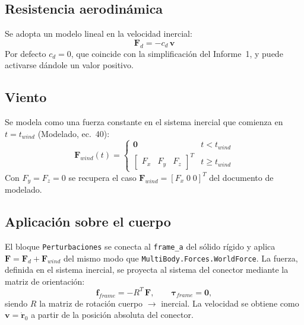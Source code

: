 \subsection{Resistencia aerodinámica}
Se adopta un modelo lineal en la velocidad inercial:
\begin{equation}
  \mathbf{F}_d = -c_d\, \mathbf{v}
\end{equation}
Por defecto $c_d = 0$, que coincide con la simplificación del Informe~1, y puede
activarse dándole un valor positivo.

\subsection{Viento}
Se modela como una fuerza constante en el sistema inercial que comienza en
$t = t_{wind}$ (Modelado, ec.~40):
\begin{equation}
  \mathbf{F}_{wind}(t) =
  \begin{cases}
    \mathbf{0} & t < t_{wind} \\
    \begin{bmatrix} F_x & F_y & F_z \end{bmatrix}^T & t \ge t_{wind}
  \end{cases}
\end{equation}
Con $F_y = F_z = 0$ se recupera el caso $\mathbf{F}_{wind} = [F_x\;0\;0]^T$ del
documento de modelado.

\subsection{Aplicación sobre el cuerpo}
El bloque \texttt{Perturbaciones} se conecta al \texttt{frame\_a} del sólido rígido y
aplica $\mathbf{F} = \mathbf{F}_d + \mathbf{F}_{wind}$ del mismo modo que
\texttt{MultiBody.Forces.WorldForce}. La fuerza, definida en el sistema inercial, se
proyecta al sistema del conector mediante la matriz de orientación:
\begin{equation}
  \mathbf{f}_{frame} = -R^T\, \mathbf{F}, \qquad \boldsymbol{\tau}_{frame} = \mathbf{0},
\end{equation}
siendo $R$ la matriz de rotación cuerpo $\rightarrow$ inercial. La velocidad se obtiene
como $\mathbf{v} = \dot{\mathbf{r}}_0$ a partir de la posición absoluta del conector.
